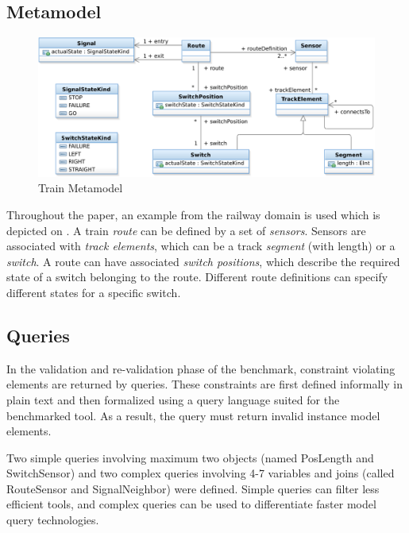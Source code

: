 \subsection{Metamodel}
\label{sec:domain}

\begin{figure}[htb!]
\begin{center}
\includegraphics[width=1\columnwidth]{figures/TrainMM.pdf}
\caption{Train Metamodel}
\label{fig:metamodel}
\end{center}
\end{figure}


Throughout the paper, an example from the railway domain is used which is depicted on . A train \emph{route} can be defined by a set of \emph{sensors}. Sensors are associated with \emph{track elements}, which can be a track \emph{segment} (with length) or a \emph{switch}. A route can have associated \emph{switch positions}, which describe the required state of a switch belonging to the route. Different route definitions can specify different states for a specific switch.
 
\subsection{Queries}
\label{sec:queries}

In the validation and re-validation phase of the benchmark, constraint violating elements are returned by queries. These constraints are first defined informally in plain text and then formalized using a query language suited for the benchmarked tool. As a result, the query must return invalid instance model elements.
 
Two simple queries involving maximum two objects (named PosLength and SwitchSensor) and two complex queries involving 4-7 variables and joins (called RouteSensor and SignalNeighbor) were defined. Simple queries can filter less efficient tools, and complex queries can be used to differentiate faster model query technologies.
 

